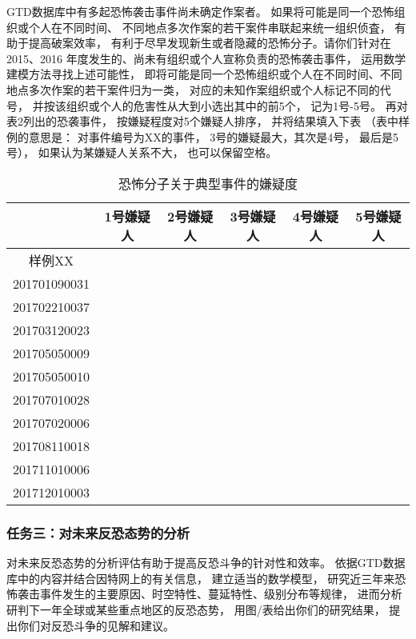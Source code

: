 \documentclass[bwprint]{gmcmthesis}
\begin{document}
GTD数据库中有多起恐怖袭击事件尚未确定作案者。
如果将可能是同一个恐怖组织或个人在不同时间、
不同地点多次作案的若干案件串联起来统一组织侦査，
有助于提高破案效率，
有利于尽早发现新生或者隐藏的恐怖分子。请你们针对在
2015、2016 年度发生的、尚未有组织或个人宣称负责的恐怖袭击事件，
运用数学建模方法寻找上述可能性，
即将可能是同一个恐怖组织或个人在不同时间、不同地点多次作案的若干案件归为一类，
对应的未知作案组织或个人标记不同的代号，
并按该组织或个人的危害性从大到小选出其中的前5个，
记为1号-5号。
再对表2列出的恐袭事件，
按嫌疑程度对5个嫌疑人排序，
并将结果填入下表
（表中样例的意思是：
对事件编号为XX的事件，
3号的嫌疑最大，其次是4号，
最后是5号），
如果认为某嫌疑人关系不大，
也可以保留空格。

\begin{table}
\centering
\caption{恐怖分子关于典型事件的嫌疑度}
\begin{tabular}{|c|c|c|c|c|c|}
  \hline
         & 1号嫌疑人 & 2号嫌疑人 & 3号嫌疑人 & 4号嫌疑人 & 5号嫌疑人 \\
  \hline
  样例XX       &  &  &  &  &  \\
  \hline
  201701090031 &  &  &  &  &  \\
  \hline
  201702210037 &  &  &  &  &  \\
  \hline
  201703120023 &  &  &  &  &  \\
  \hline
  201705050009 &  &  &  &  &  \\
  \hline
  201705050010 &  &  &  &  &  \\
  \hline
  201707010028 &  &  &  &  &  \\
  \hline
  201707020006 &  &  &  &  &  \\
  \hline
  201708110018 &  &  &  &  &  \\
  \hline
  201711010006 &  &  &  &  &  \\
  \hline
  201712010003 &  &  &  &  &  \\
  \hline
\end{tabular}
\end{table}


\subsubsection{任务三：对未来反恐态势的分析}

对未来反恐态势的分析评估有助于提高反恐斗争的针对性和效率。
依据GTD数据库中的内容并结合因特网上的有关信息，
建立适当的数学模型，
研究近三年来恐怖袭击事件发生的主要原因、时空特性、蔓延特性、级别分布等规律，
进而分析研判下一年全球或某些重点地区的反恐态势，
用图/表给出你们的研究结果，
提出你们对反恐斗争的见解和建议。
\end{document}
